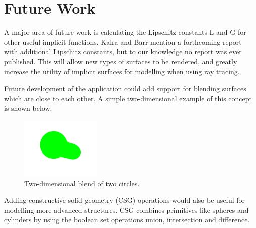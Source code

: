 \documentclass[conference]{acmsiggraph}
\begin{document}
\section{Future Work}

A major area of future work is calculating the Lipschitz constants L and G
for other useful implicit functions.  Kalra and Barr \cite{KalraBarr1989} 
mention a forthcoming report with additional Lipschitz constants, but to
our knowledge no report was ever published.  This will allow new types of
surfaces to be rendered, and greatly increase the utility of implicit 
surfaces for modelling when using ray tracing.

Future development of the application could add support for blending surfaces
which are close to each other.  A simple two-dimensional example of this concept
is shown below.

\begin{figure}[ht]
  \centering
  \includegraphics[width=1.5in]{figures/blend2d.png}
  \caption{Two-dimensional blend of two circles.}
\end{figure}

Adding constructive solid geometry (CSG) operations would also be useful
for modelling more advanced structures.  CSG combines primitives like 
spheres and cylinders by using the boolean set operations union,
intersection and difference.



\end{document}
